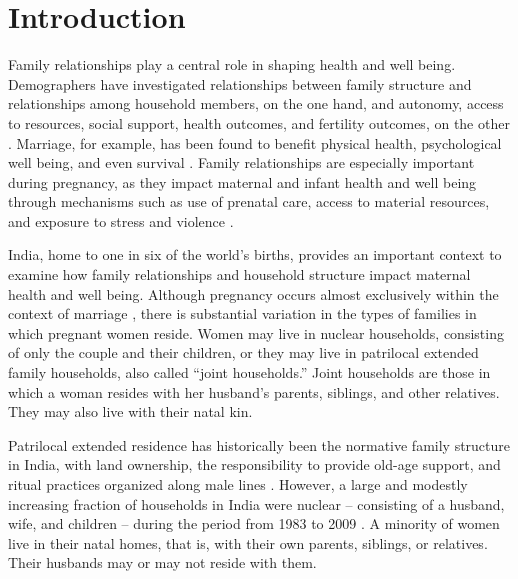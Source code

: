 \documentclass[10pt,twoside,reqno]{article}
\begin{document}

\section*{Introduction}\label{sec:Introduction} %

Family relationships play a central role in shaping health and well being. Demographers have investigated relationships between family structure and relationships among household members, on the one hand, and autonomy, access to resources, social support, health outcomes, and fertility outcomes, on the other \citep{umberson2010social, axinn2017emotional, mclanahan2008family}. Marriage, for example, has been found to benefit physical health, psychological well being, and even survival \citep{carr2014happy,soons2009marriage,lillard1996marital}. Family relationships are especially important during pregnancy, as they impact maternal and infant health and well being through mechanisms such as use of prenatal care, access to material resources, and exposure to stress and violence \citep{osborne2012family,molina2025unmarried,bloom2001dimensions}.

India, home to one in six of the world’s births, provides an important context to examine how family relationships and household structure impact maternal health and well being.  Although pregnancy occurs almost exclusively within the context of marriage \citep{banerji2021does}, there is substantial variation in the types of families in which pregnant women reside. Women may live in nuclear households, consisting of only the couple and their children, or they may live in patrilocal extended family households, also called ``joint households.''  Joint households are those in which a woman resides with her husband’s parents, siblings, and other relatives.  They may also live with their natal kin.

Patrilocal extended residence has historically been the normative family structure in India, with land ownership, the responsibility to provide old-age support, and ritual practices organized along male lines \citep{jayachandran2015roots}.  However, a large and modestly increasing fraction of households in India were nuclear -- consisting of a husband, wife, and children -- during the period from 1983 to 2009 \citep{breton2021modernisation}.  A minority of women live in their natal homes, that is, with their own parents, siblings, or relatives.  Their husbands may or may not reside with them.
\end{document}
